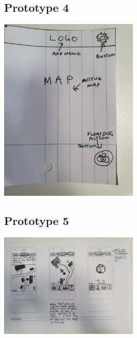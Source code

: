 \documentclass[10pt,twocolumn]{article} %
\begin{document}
\subsection*{Prototype 4}
\includegraphics[width=0.5\textwidth]{./figures/shauns_initial_proto/1.jpg}

\subsection*{Prototype 5}
\includegraphics[width=0.5\textwidth]{./figures/belindas_initial_proto/1.jpg}

\newpage
\end{document}
